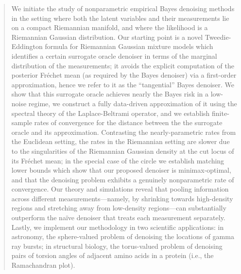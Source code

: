 \documentclass[preprint]{imsart}
\theoremstyle{plain}
\theoremstyle{definition}
\begin{document}
\begin{frontmatter}
\begin{abstract}
    We initiate the study of nonparametric empirical Bayes denoising methods in the setting where both the latent variables and their measurements lie on a compact Riemannian manifold, and where the likelihood is a Riemannian Gaussian distribution.
    Our starting point is a novel Tweedie-Eddington formula for Riemannian Gaussian mixture models which identifies a certain surrogate oracle denoiser in terms of the marginal distribution of the measurements; it avoids the explicit computation of the posterior Fr\'echet mean (as required by the Bayes denoiser) via a first-order approximation, hence we refer to it as the ``tangential'' Bayes denoiser.
    We show that this surrogate oracle achieves nearly the Bayes risk in a low-noise regime, we construct a fully data-driven approximation of it using the spectral theory of the Laplace-Beltrami operator, and we establish finite-sample rates of convergence for the distance between the the surrogate oracle and its approximation.
    Contrasting the nearly-parametric rates from the Euclidean setting, the rates in the Riemannian setting are slower due to the singularities of the Riemannian Gaussian density at the cut locus of its Fr\'echet mean; in the special case of the circle we establish matching lower bounds which show that our proposed denoiser is minimax-optimal, and that the denoising problem exhibits a genuinely nonparametric rate of convergence.
    Our theory and simulations reveal that pooling information across different measurements---namely, by shrinking towards high-density regions and stretching away from low-density regions---can substantially outperform the na\"ive denoiser that treats each measurement separately.
    Lastly, we implement our methodology in two scientific applications: in astronomy, the sphere-valued problem of denoising the locations of gamma ray bursts; in structural biology, the torus-valued problem of denoising pairs of torsion angles of adjacent amino acids in a protein (i.e., the Ramachandran plot).
\end{abstract}

\begin{keyword}[class=MSC]
\end{keyword}

\begin{keyword}
\end{keyword}

\end{frontmatter}
\setcounter{tocdepth}{1}
\tableofcontents
\end{document}
